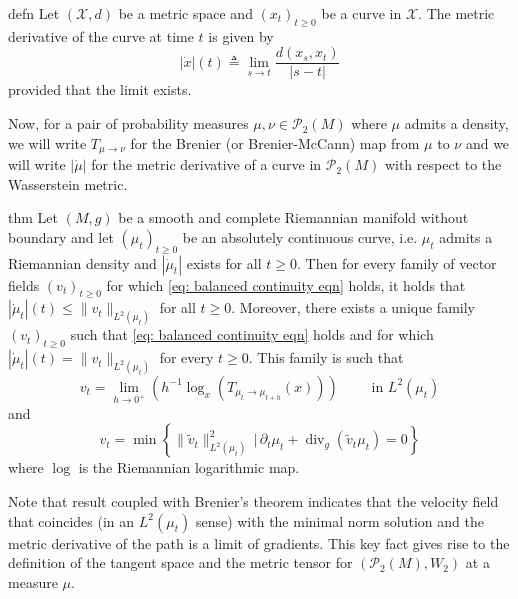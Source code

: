 \documentclass[11pt]{article}
\newcommand{\man}{M}
\begin{document}
\begin{restatable}{defn}{}
    Let $(\mathcal{X}, d)$ be a metric space and $(x_t)_{t \geq 0}$ be a curve in $\mathcal{X}$. The metric derivative of the curve at time $t$ is given by
    \begin{equation*}
        |\dot x|(t) \triangleq \lim_{s\rightarrow t}\frac{d(x_s, x_t)}{|s - t|}
    \end{equation*}
    provided that the limit exists. 
\end{restatable}

Now, for a pair of probability measures $\mu, \nu \in \mathcal{P}_{2}(\man)$ where $\mu$ admits a density, we will write $T_{\mu \rightarrow \nu}$ for the Brenier (or Brenier-McCann) map from $\mu$ to $\nu$ and we will write $|\dot \mu|$ for the metric derivative of a curve in $\mathcal{P}_{2}(\man)$ with respect to the Wasserstein metric.

\begin{restatable}{thm}{}
    Let $(M, g)$ be a smooth and complete Riemannian manifold without boundary and let $(\mu_t)_{t\geq 0}$ be an absolutely continuous curve, i.e. $\mu_t$ admits a Riemannian density and $|\dot \mu_t|$ exists for all $t \geq 0$. Then for every family of vector fields $(v_t)_{t\geq 0}$ for which \cref{eq: balanced continuity eqn} holds, it holds that $|\dot \mu_t|(t) \leq \|v_t\|_{L^2(\mu_t)}$ for all $t \geq 0$. Moreover, there exists a unique family $(v_t)_{t\geq 0}$ such that \cref{eq: balanced continuity eqn} holds and for which $|\dot \mu_t|(t) = \|v_t\|_{L^2(\mu_t)}$ for every $t \geq 0$. This family is such that
    \begin{equation*}
        v_t = \lim_{h \rightarrow0^+}\left(h^{-1}\log_x(T_{\mu_t\rightarrow \mu_{t+h}}(x))\right) \qquad \text{ in $L^2(\mu_t)$}
    \end{equation*}
    and
    \begin{equation*}
        v_t = \min \left\{\|\tilde{v}_t\|_{L^2(\mu_t)}^2 \, \Big|\, \partial_t\mu_t + \operatorname{div}_g(\tilde v_t\mu_t) = 0\right\}
    \end{equation*}
    where $\log$ is the Riemannian logarithmic map. 
\end{restatable}

Note that result coupled with Brenier's theorem indicates that the velocity field that coincides (in an $L^2(\mu_t)$ sense) with the minimal norm solution and the metric derivative of the path is a limit of gradients. This key fact gives rise to the definition of the tangent space and the metric tensor for $(\mathcal{P}_{2}(\man), W_2)$ at a measure $\mu$. 
\end{document}
